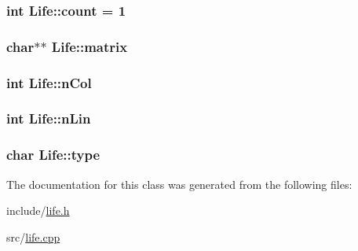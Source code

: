 \subsubsection[{\texorpdfstring{count}{count}}]{\setlength{\rightskip}{0pt plus 5cm}int Life\+::count = 1\hspace{0.3cm}{\ttfamily [private]}}\hypertarget{classLife_a29f2873b42b36f6bd69a7b9e07f9eda9}{}\label{classLife_a29f2873b42b36f6bd69a7b9e07f9eda9}
\subsubsection[{\texorpdfstring{matrix}{matrix}}]{\setlength{\rightskip}{0pt plus 5cm}char$\ast$$\ast$ Life\+::matrix\hspace{0.3cm}{\ttfamily [private]}}\hypertarget{classLife_a2f62f4ff6ec85d88de087aa9fd228054}{}\label{classLife_a2f62f4ff6ec85d88de087aa9fd228054}
\subsubsection[{\texorpdfstring{n\+Col}{nCol}}]{\setlength{\rightskip}{0pt plus 5cm}int Life\+::n\+Col\hspace{0.3cm}{\ttfamily [private]}}\hypertarget{classLife_a8e1450e50642cc56b7697dc473be4dee}{}\label{classLife_a8e1450e50642cc56b7697dc473be4dee}
\subsubsection[{\texorpdfstring{n\+Lin}{nLin}}]{\setlength{\rightskip}{0pt plus 5cm}int Life\+::n\+Lin\hspace{0.3cm}{\ttfamily [private]}}\hypertarget{classLife_a3d1e835008666154b80d675664719e2e}{}\label{classLife_a3d1e835008666154b80d675664719e2e}
\subsubsection[{\texorpdfstring{type}{type}}]{\setlength{\rightskip}{0pt plus 5cm}char Life\+::type}\hypertarget{classLife_a32121ce5b98c0b7d8b1b0f2a5f1114aa}{}\label{classLife_a32121ce5b98c0b7d8b1b0f2a5f1114aa}


The documentation for this class was generated from the following files\+:\begin{DoxyCompactItemize}
\item 
include/\hyperlink{life_8h}{life.\+h}\item 
src/\hyperlink{life_8cpp}{life.\+cpp}\end{DoxyCompactItemize}

